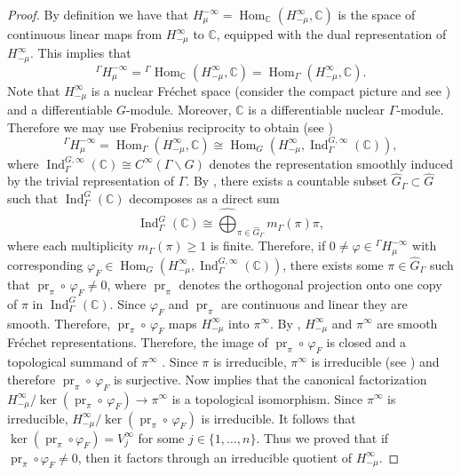 \documentclass[JEP,XML,SOM,NoFloatCountersInSection,Unicode,published]{cedram}
\newcommand{\Ga}{{}^\Gamma\!}
\theoremstyle{definition}
\newcommand{\on}[1]{\ensuremath{\operatorname{#1}}}
\newcommand{\Hom}[3]{\ensuremath{\on{Hom}_{#1}(#2,#3)}}
\newcommand{\C}{\ensuremath{\mathbb{C}}}
\newcommand{\pss}[2]{\ensuremath{H_{#2}^\infty}}
\newcommand{\psd}[2]{\ensuremath{H_{#2}^{-\infty}}}
\begin{document}
\begin{proof}
By definition we have that $\psd{\sigma}{\mu}=\Hom{\C}{\pss{\tilde\sigma}{-\mu}}{\C}$ is the space of continuous linear maps from $\pss{\tilde\sigma}{-\mu}$ to $\C$, equipped with the dual representation of $\pss{\tilde\sigma}{-\mu}$. This implies that\vspace*{-3pt}
\begin{equation}\label{eq:pf_Gamma_inv}
\Ga\psd{\sigma}{\mu}=\Ga\Hom{\C}{\pss{\tilde\sigma}{-\mu}}{\C}=\Hom{\Gamma}{\pss{\tilde\sigma}{-\mu}}{\C}.
\end{equation}
Note that $\pss{\tilde\sigma}{-\mu}$ is a nuclear Fréchet space (consider the compact picture and see \eg \cite[\S 2]{CHM00}) and a differentiable $G$-module. Moreover, $\C$ is a differentiable nuclear $\Gamma$-module. Therefore we may use Frobenius reciprocity to obtain (see \cite[Lem.\,1.3]{Z78})\vspace*{-3pt}
\[
\Ga\psd{\sigma}{\mu}=\Hom{\Gamma}{\pss{\tilde\sigma}{-\mu}}{\C}\cong\Hom{G}{\pss{\tilde\sigma}{-\mu}}{\on{Ind}_\Gamma^{G,\infty}(\C)},
\]
where $\on{Ind}_\Gamma^{G,\infty}(\C)\cong C^\infty(\Gamma\backslash G)$ denotes the representation smoothly induced by the trivial representation of $\Gamma$.
By \cite[Th., Ch.\,1, \S 2.3]{GGPS69}, there exists a countable subset $\hat G_\Gamma\subset\hat G$ such that $\on{Ind}_\Gamma^{G}(\C)$ decomposes as a direct sum
\[
\on{Ind}_\Gamma^{G}(\C)\cong\widehat\bigoplus_{\pi\in\hat G_\Gamma}m_\Gamma(\pi)\pi,
\]
where each multiplicity $m_\Gamma(\pi)\geq 1$ is finite. Therefore, if $0\neq\varphi\in\Ga\psd{\sigma}{\mu}$ with corresponding $\varphi_F\in\Hom{G}{\pss{\tilde\sigma}{-\mu}}{\on{Ind}_\Gamma^{G,\infty}(\C)}$, there exists some $\pi\in\hat G_\Gamma$ such that $\on{pr}_\pi\circ\,\varphi_F\neq 0$, where $\on{pr}_\pi$ denotes the orthogonal projection onto one copy of $\pi$ in $\on{Ind}_\Gamma^{G}(\C)$. Since $\varphi_F$ and $\on{pr}_\pi$ are continuous and linear they are smooth. Therefore, $\on{pr}_\pi\circ\,\varphi_F$ maps $\pss{\tilde\sigma}{-\mu}$ into $\pi^\infty$. By \cite[\S 4.4, p.\,253]{W72}, $\pss{\tilde\sigma}{-\mu}$ and $\pi^\infty$ are smooth Fréchet representations. Therefore, the image of $\on{pr}_\pi\circ\,\varphi_F$ is closed and a topological summand of $\pi^\infty$ \cite[Lem.\,11.5.1 (moderate growth), Th.\,11.6.7(2)]{W92}. Since $\pi$ is irreducible, $\pi^\infty$ is irreducible (see \eg \cite[p.\,254]{W72}) and therefore $\on{pr}_\pi\circ\,\varphi_F$ is surjective. Now \cite[Th.\,12.16.8]{D70} implies that the canonical factorization $\pss{\tilde\sigma}{-\mu}/\ker(\on{pr}_\pi\circ\,\varphi_F)\to\pi^\infty$ is a topological isomorphism. Since $\pi^\infty$ is irreducible, $\pss{\tilde\sigma}{-\mu}/\ker(\on{pr}_\pi\circ\,\varphi_F)$ is irreducible. It follows that $\ker(\on{pr}_\pi\circ\varphi_F)=V_j^\infty$ for some $j\in\{1,\ldots,n\}$.
Thus we proved that if $\on{pr}_\pi\circ\varphi_F\neq0$, then it factors through an irreducible quotient of $\pss{\tilde\sigma}{-\mu}$.


\end{proof}
\end{document}
